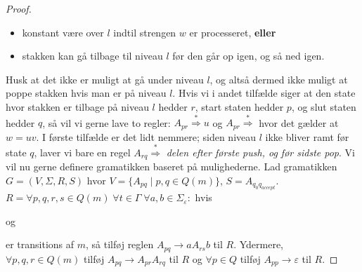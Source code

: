 \begin{proof}
  \begin{itemize}
    \item konstant være over $l$ indtil strengen $w$ er processeret, \textbf{eller}
    \item stakken kan gå tilbage til niveau $l$ før den går op igen, og så ned igen.
  \end{itemize}
  Husk at det ikke er muligt at gå under niveau $l$, og altså dermed ikke muligt at poppe stakken hvis man er på niveau $l$. Hvis vi i andet tilfælde siger at den state hvor stakken er tilbage på niveau $l$ hedder $r$, start staten hedder $p$, og slut staten hedder $q$, så vil vi gerne lave to regler: $A_{pr} \stackrel{*}{\Rightarrow} u$ og $A_{pr} \stackrel{*}{\Rightarrow}$ hvor det gælder at $w = uv$. I første tilfælde er det lidt nemmere; siden niveau $l$ ikke bliver ramt før state $q$, laver vi bare en regel $A_{rq} \stackrel{*}{\Rightarrow}$ \textit{delen efter første push, og før sidste pop}.
  Vi vil nu gerne definere gramatikken baseret på mulighederne. Lad gramatikken $G = (V, \Sigma, R, S)$ hvor $V = \{A_{pq} \; |\; p,q \in Q(m)\}$, $S = A_{q_0q_{accept}}$. $R = \forall p,q,r,s \in Q(m)\; \forall t \in \Gamma \; \forall a, b \in \Sigma_\varepsilon :$
  hvis

  \begin{center}

  \end{center}
og
\begin{center}

\end{center}
  er transitions af $m$, så tilføj reglen $A_{pq} \rightarrow aA_{rs}b$ til $R$. Ydermere, $\forall p,q,r \in Q(m)$ tilføj $A_{pq} \rightarrow A_{pr}A_{rq}$ til $R$ og $\forall p \in Q$ tilføj $A_{pp} \rightarrow \varepsilon$ til $R$.
\end{proof}

